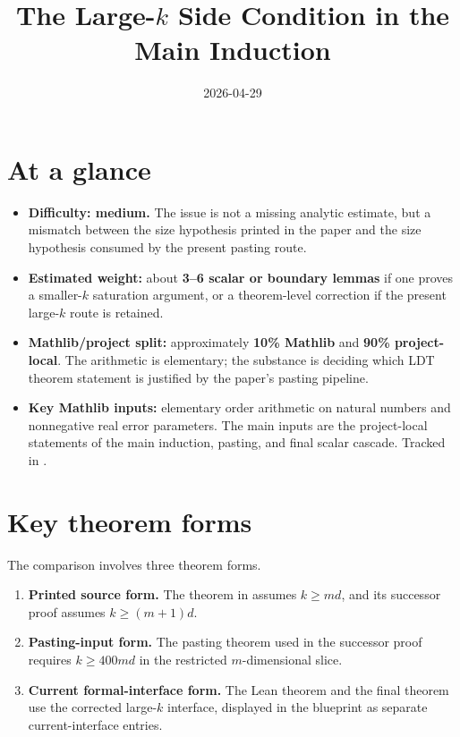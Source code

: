 \documentclass[11pt]{article}
\title{The Large-\texorpdfstring{$k$}{k} Side Condition in the Main Induction}
\author{}
\date{2026-04-29}
\begin{document}
\maketitle

\section{At a glance}

\begin{itemize}
  \item \textbf{Difficulty: medium.}  The issue is not a missing analytic
  estimate, but a mismatch between the size hypothesis printed in the paper and
  the size hypothesis consumed by the present pasting route.
  \item \textbf{Estimated weight:} about \textbf{3--6 scalar or boundary
  lemmas} if one proves a smaller-\(k\) saturation argument, or a theorem-level
  correction if the present large-\(k\) route is retained.
  \item \textbf{Mathlib/project split:} approximately \textbf{10\% Mathlib} and
  \textbf{90\% project-local}.  The arithmetic is elementary; the substance is
  deciding which LDT theorem statement is justified by the paper's pasting
  pipeline.
  \item \textbf{Key Mathlib inputs:} elementary order arithmetic on natural
  numbers and nonnegative real error parameters.  The main inputs are the
  project-local statements of the main induction, pasting, and final scalar
  cascade.  Tracked in .
\end{itemize}

\section{Key theorem forms}

The comparison involves three theorem forms.
\begin{enumerate}
  \item \textbf{Printed source form.}  The theorem in
   assumes \(k\ge md\), and its
  successor proof assumes \(k\ge (m+1)d\).
  \item \textbf{Pasting-input form.}  The pasting theorem used in the successor
  proof requires \(k\ge 400md\) in the restricted \(m\)-dimensional slice.
  \item \textbf{Current formal-interface form.}  The Lean theorem
   and the final theorem
   use the corrected large-\(k\)
  interface, displayed in the blueprint as separate current-interface entries.
\end{enumerate}
\end{document}
